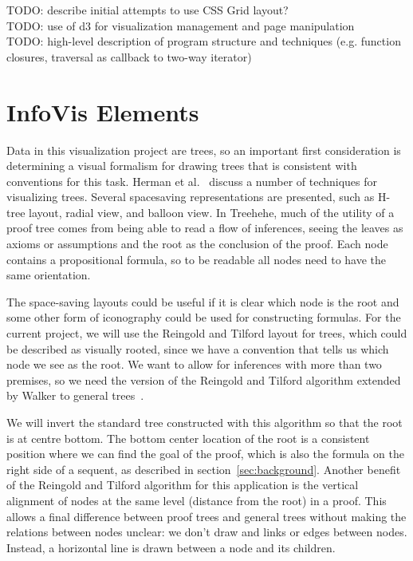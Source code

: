 \documentclass[conference]{IEEEtran}
\newcommand{\projectname}{Treehehe}
\begin{document}
TODO: describe initial attempts to use CSS Grid layout? \\

TODO: use of d3 for visualization management and page manipulation \\

TODO: high-level description of program structure and techniques (e.g. function closures, traversal as callback to two-way iterator) \\


\section{InfoVis Elements}
\label{sec:infoviselem}

Data in this visualization project are trees, so an important first consideration is determining a visual formalism for drawing trees that is consistent with conventions for this task. Herman et al.~\cite{graphvis-herman+melancon+marshall} discuss a number of techniques for visualizing trees. Several spacesaving representations are presented, such as H-tree layout, radial view, and balloon view. In \projectname{}, much of the utility of a proof tree comes from being able to read a flow of inferences, seeing the leaves as axioms or assumptions and the root as the conclusion of the proof. Each node contains a propositional formula, so to be readable all nodes need to have the same orientation.

The space-saving layouts could be useful if it is clear which node is the root and some other form of iconography could be used for constructing formulas. For the current project, we will use the Reingold and Tilford layout for trees, which could be described as visually rooted, since we have a convention that tells us which node we see as the root. We want to allow for inferences with more than two premises, so we need the version of the Reingold and Tilford algorithm extended by Walker to general trees~\cite{generaltreeslayout-walker}.

We will invert the standard tree constructed with this algorithm so that the root is at centre bottom. The bottom center location of the root is a consistent position where we can find the goal of the proof, which is also the formula on the right side of a sequent, as described in section~\ref{sec:background}. Another benefit of the Reingold and Tilford algorithm for this application is the vertical alignment of nodes at the same level (distance from the root) in a proof. This allows a final difference between proof trees and general trees without making the relations between nodes unclear: we don't draw and links or edges between nodes. Instead, a horizontal line is drawn between a node and its children.
\end{document}
